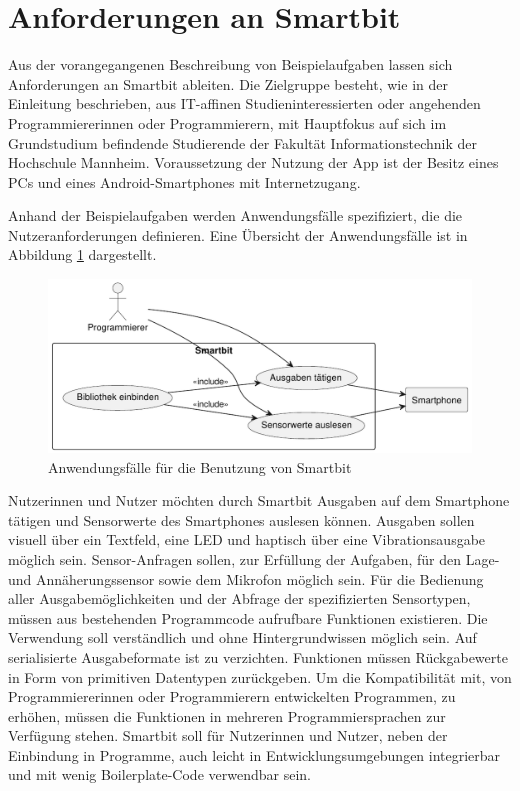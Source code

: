 \documentclass[11pt,a4paper]{report}
\begin{document}
\section{Anforderungen an Smartbit}\label{sec:anforderungen}
Aus der vorangegangenen Beschreibung von Beispielaufgaben lassen sich Anforderungen an Smartbit ableiten.
Die Zielgruppe besteht, wie in der Einleitung beschrieben, aus IT-affinen Studieninteressierten oder angehenden Programmiererinnen oder Programmierern, mit Hauptfokus auf sich im Grundstudium befindende Studierende der Fakultät Informationstechnik der Hochschule Mannheim.
Voraussetzung der Nutzung der App ist der Besitz eines PCs und eines Android-Smartphones  mit Internetzugang.

Anhand der Beispielaufgaben werden Anwendungsfälle spezifiziert, die die Nutzeranforderungen definieren.
Eine Übersicht der Anwendungsfälle ist in Abbildung \ref{fig:usecase} dargestellt.
\begin{figure}[htbp]
  \centering
  \includegraphics[width=.8\textwidth]{images/usecase_usage.pdf}
  \caption{Anwendungsfälle für die Benutzung von Smartbit}
  \label{fig:usecase}
\end{figure}
Nutzerinnen und Nutzer möchten durch Smartbit Ausgaben auf dem Smartphone tätigen und Sensorwerte des Smartphones auslesen können.
Ausgaben sollen visuell über ein Textfeld, eine LED und haptisch über eine Vibrationsausgabe möglich sein.
Sensor-Anfragen sollen, zur Erfüllung der Aufgaben, für den Lage- und Annäherungssensor sowie dem Mikrofon möglich sein.
Für die Bedienung aller Ausgabemöglichkeiten und der Abfrage der spezifizierten Sensortypen, müssen aus bestehenden Programmcode aufrufbare Funktionen existieren.
Die Verwendung soll verständlich und ohne Hintergrundwissen möglich sein.
Auf serialisierte Ausgabeformate ist zu verzichten.
Funktionen müssen Rückgabewerte in Form von primitiven Datentypen zurückgeben.
Um die Kompatibilität mit, von Programmiererinnen oder Programmierern entwickelten Programmen, zu erhöhen, müssen die Funktionen in mehreren Programmiersprachen zur Verfügung stehen.
Smartbit soll für Nutzerinnen und Nutzer, neben der Einbindung in Programme, auch leicht in Entwicklungsumgebungen integrierbar und mit wenig Boilerplate-Code verwendbar sein.
\end{document}
